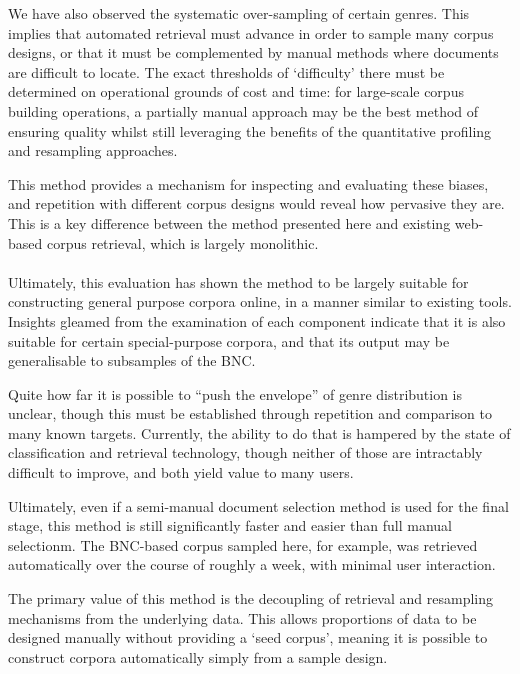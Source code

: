We have also observed the systematic over-sampling of certain genres.  This implies that automated retrieval must advance in order to sample many corpus designs, or that it must be complemented by manual methods where documents are difficult to locate.  The exact thresholds of `difficulty' there must be determined on operational grounds of cost and time: for large-scale corpus building operations, a partially manual approach may be the best method of ensuring quality whilst still leveraging the benefits of the quantitative profiling and resampling approaches.

This method provides a mechanism for inspecting and evaluating these biases, and repetition with different corpus designs would reveal how pervasive they are.  This is a key difference between the method presented here and existing web-based corpus retrieval, which is largely monolithic.

\paragraph{}

Ultimately, this evaluation has shown the method to be largely suitable for constructing general purpose corpora online, in a manner similar to existing tools.  Insights gleamed from the examination of each component indicate that it is also suitable for certain special-purpose corpora, and that its output may be generalisable to subsamples of the BNC.

Quite how far it is possible to ``push the envelope'' of genre distribution is unclear, though this must be established through repetition and comparison to many known targets.  Currently, the ability to do that is hampered by the state of classification and retrieval technology, though neither of those are intractably difficult to improve, and both yield value to many users.

Ultimately, even if a semi-manual document selection method is used for the final stage, this method is still significantly faster and easier than full manual selectionm.  The BNC-based corpus sampled here, for example, was retrieved automatically over the course of roughly a week, with minimal user interaction.

The primary value of this method is the decoupling of retrieval and resampling mechanisms from the underlying data.  This allows proportions of data to be designed manually without providing a `seed corpus', meaning it is possible to construct corpora automatically simply from a sample design.




